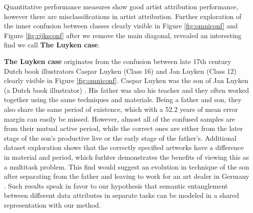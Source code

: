 \documentclass[sigconf]{acmart}
\begin{document}
 Quantitative performance measures show good artist attribution performance, however there are misclassifications in artist attribution. Further exploration of the inner confusion between classes clearly visible in Figure \ref{fig:omniconf} and Figure \ref{fig:rijksconf} after we remove the main diagonal, revealed an interesting find we call \textbf{The Luyken case}. 

\textbf{The Luyken case} originates from the confusion between late 17th century Dutch book illustrators Caspar Luyken (Class 16) and Jan Luyken (Class 12) clearly visible in Figure \ref{fig:omniconf}. Caspar Luyken was the son of Jan Luyken (a Dutch book illustrator) \cite{franits2004dutch}. His father was also his teacher and they often worked together using the same techniques and materials. Being a father and son, they also share the same period of existence, which with a 52.2 years of mean error margin can easily be missed. However, almost all of the confused samples are from their mutual active period, while the correct ones are either from the later stage of the son's productive live or the early stage of the father's. Additional dataset exploration shows that the correctly specified artworks have a difference in material and period, which furhter demonstrates the benefits of viewing this as a multitask problem. This find would suggest an evolution in technique of the son after separating from the father and leaving to work for an art dealer in Germany \cite{doi:10.7227/ALX.21.2.2}. Such results speak in favor to our hypothesis that semantic entanglement between different data attributes in separate tasks can be modeled in a shared representation with our method. 

\end{document}
